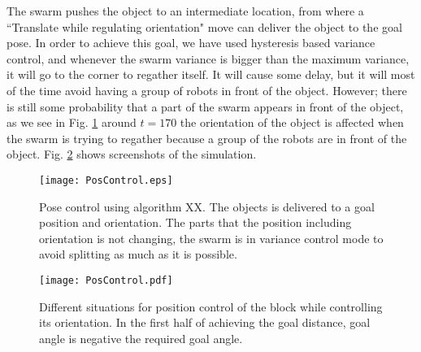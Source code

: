 The swarm pushes the object to an intermediate location, from where a ``Translate while regulating orientation" move can deliver the object to the goal pose. 
In order to achieve this goal, we have used hysteresis based variance control, and whenever the swarm variance is bigger than the maximum variance, it will go to the corner to regather itself. 
It will cause some delay, but it will most of the time avoid having a group of robots in front of the object. However; there is still some probability that a part of the swarm appears in front of the object, as we see in Fig. \ref{fig:PosControlFig} around $t=170$ the orientation of the object is affected when the swarm is trying to regather because a group of the robots are in front of the object. Fig. \ref{fig:PosScreenShot} shows screenshots of the simulation.

\begin{figure}
\begin{center}
	\texttt{[image: PosControl.eps]}
\end{center}
\vspace{-2em}
\caption{\label{fig:PosControlFig} 
Pose control using algorithm XX.  The objects is delivered to a goal position and orientation. The parts that the position including orientation is not changing, the swarm is in variance control mode to avoid splitting as much as it is possible. 
}
\vspace{-1em}
\end{figure}

\begin{figure}
\begin{center}
	\texttt{[image: PosControl.pdf]}
\end{center}
\vspace{-2em}
\caption{\label{fig:PosScreenShot}
Different situations for position control of the block while controlling its orientation. In the first half of achieving the goal distance, goal angle is negative the required goal angle.
}
\vspace{-0.5em}
\end{figure}


